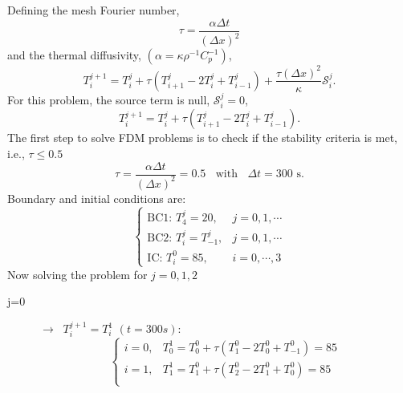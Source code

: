 \documentclass[calculator,datasheet,handbook,solutions]{exam}
\begin{document}
\begin{question}
\begin{enumerate}
\begin{enumerate}[a)]
{\begin{displaymath}
          \end{displaymath}
          Defining the mesh Fourier number,
          \begin{displaymath}
            \tau = \frac{\alpha \Delta t}{\left(\Delta x\right)^{2}}
          \end{displaymath}
          and the thermal diffusivity, $\left(\alpha=\kappa\rho^{-1}C_{p}^{-1}\right)$,
          \begin{displaymath}
            T_{i}^{j+1} = T_{i}^{j} + \tau\left(T_{i+1}^{j} - 2T_{i}^{j}+T_{i-1}^{j}\right) + \frac{\tau\left(\Delta x\right)^{2}}{\kappa}\mathcal{S}_{i}^{j}.
          \end{displaymath}
          For this problem, the source term is null, $\mathcal{S}_{i}^{j}=0$,~
          \begin{displaymath}
            T_{i}^{j+1} = T_{i}^{j} + \tau\left(T_{i+1}^{j} - 2T_{i}^{j}+T_{i-1}^{j}\right).
          \end{displaymath}
          The first step to solve FDM problems is to check if the stability criteria is met, i.e., $\tau \le 0.5$~
          \begin{displaymath}
            \tau = \frac{\alpha \Delta t}{\left(\Delta x\right)^{2}} = 0.5 \;\;\text{ with }\;\;\Delta t = 300\text{ s}.
          \end{displaymath}
          Boundary and initial conditions are:~
          \begin{displaymath}
            \begin{cases}
               \text{BC1: } T_{4}^{j} = 20, & j = 0,1,\cdots \\
               \text{BC2: } T_{i}^{j} = T_{-1}^{j}, & j = 0,1,\cdots \\
               \text{IC: } T_{i}^{0} = 85, & i = 0,\cdots, 3 
            \end{cases}
          \end{displaymath}
          Now solving the problem for $j=0,1,2$
          \begin{description}
            \item[j=0] $\rightarrow\;\;T_{i}^{j+1}=T_{i}^{1}$ $\left(t=300 s\right)$:
              \begin{displaymath}
                \begin{cases}
                   i=0, & T_{0}^{1} = T_{0}^{0} + \tau\left(T_{1}^{0}-2T_{0}^{0}+T_{-1}^{0}\right) = 85 \\
                   i=1, & T_{1}^{1} = T_{1}^{0} + \tau\left(T_{2}^{0}-2T_{1}^{0}+T_{0}^{0}\right) = 85 \\

\end{cases}
\end{displaymath}
\end{description}}
\end{enumerate}
\end{enumerate}
\end{question}
\end{document}
